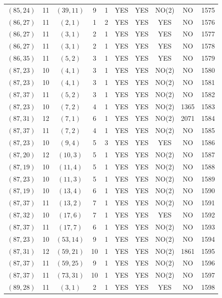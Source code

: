 \begin{longtable}{|c|c|c|c|c|c|c|c|c|c|}
$(85, 24)$ & 11 & $(39, 11)$ & 9 & 1 & YES & YES & NO(2) & NO & 1575\\
$(86, 27)$ & 11 & $(2, 1)$ & 1 & 2 & YES & YES & YES & NO & 1576\\
$(86, 27)$ & 11 & $(3, 1)$ & 2 & 1 & YES & YES & YES & NO & 1577\\
$(86, 27)$ & 11 & $(3, 1)$ & 2 & 1 & YES & YES & YES & NO & 1578\\
$(86, 35)$ & 11 & $(5, 2)$ & 3 & 1 & YES & YES & YES & NO & 1579\\
$(87, 23)$ & 10 & $(4, 1)$ & 3 & 1 & YES & YES & NO(2) & NO & 1580\\
$(87, 23)$ & 10 & $(4, 1)$ & 3 & 1 & YES & YES & NO(2) & NO & 1581\\
$(87, 37)$ & 11 & $(5, 2)$ & 3 & 1 & YES & YES & NO(2) & NO & 1582\\
$(87, 23)$ & 10 & $(7, 2)$ & 4 & 1 & YES & YES & NO(2) & 1365 & 1583\\
$(87, 31)$ & 12 & $(7, 1)$ & 6 & 1 & YES & YES & NO(2) & 2071 & 1584\\
$(87, 37)$ & 11 & $(7, 2)$ & 4 & 1 & YES & YES & NO(2) & NO & 1585\\
$(87, 23)$ & 10 & $(9, 4)$ & 5 & 3 & YES & YES & YES & NO & 1586\\
$(87, 20)$ & 12 & $(10, 3)$ & 5 & 1 & YES & YES & NO(2) & NO & 1587\\
$(87, 19)$ & 10 & $(11, 4)$ & 5 & 1 & YES & YES & NO(2) & NO & 1588\\
$(87, 23)$ & 10 & $(11, 3)$ & 5 & 1 & YES & YES & NO(2) & NO & 1589\\
$(87, 19)$ & 10 & $(13, 4)$ & 6 & 1 & YES & YES & NO(2) & NO & 1590\\
$(87, 37)$ & 11 & $(13, 2)$ & 7 & 1 & YES & YES & NO(2) & NO & 1591\\
$(87, 32)$ & 10 & $(17, 6)$ & 7 & 1 & YES & YES & YES & NO & 1592\\
$(87, 37)$ & 11 & $(17, 7)$ & 6 & 1 & YES & YES & NO(2) & NO & 1593\\
$(87, 23)$ & 10 & $(53, 14)$ & 9 & 1 & YES & YES & NO(2) & NO & 1594\\
$(87, 31)$ & 12 & $(59, 21)$ & 10 & 1 & YES & YES & NO(2) & 1861 & 1595\\
$(87, 37)$ & 11 & $(59, 25)$ & 9 & 1 & YES & YES & NO(2) & NO & 1596\\
$(87, 37)$ & 11 & $(73, 31)$ & 10 & 1 & YES & YES & NO(2) & NO & 1597\\
$(89, 28)$ & 11 & $(3, 1)$ & 2 & 1 & YES & YES & YES & NO & 1598\\

\end{longtable}
